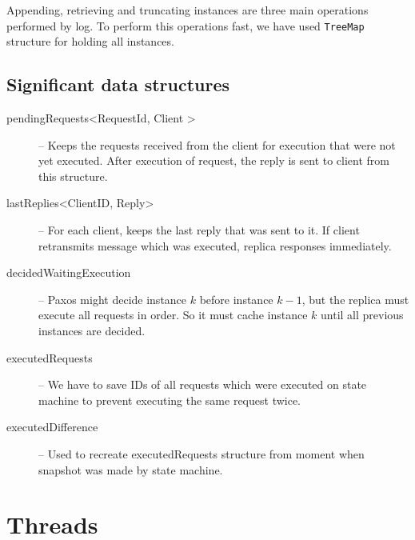 Appending, retrieving and truncating instances are three main operations performed by log. To perform this operations fast, we have used \texttt{TreeMap} structure for holding all instances.

\subsection{Significant data structures}
\label{subsubsec:significant_structures}
  \begin{description}
    \item[pendingRequests\textless RequestId, Client \textgreater] -- Keeps the requests received from the client for execution that were not yet executed. After execution of request, the reply is sent to client from this structure.
    \item[lastReplies\textless ClientID, Reply\textgreater] -- For each c\-li\-en\-t, keeps the last reply that was sent to it. If client retransmits message which was executed, replica responses immediately.
    \item[decidedWaitingExecution] -- Paxos might d\-e\-cide instance $k$ before instance $k-1$, but the replica must execute all requests in order. So it must cache instance $k$ until all previous instances are decided.
    \item[executedRequests] -- We have to save IDs of all requests which were executed on state machine to prevent executing the same request twice. 
	\item[executedDifference] -- Used to recreate executedRequests structure from moment when snapshot was made by state machine.
  \end{description}


\section{Threads}
\label{sec:threads}


